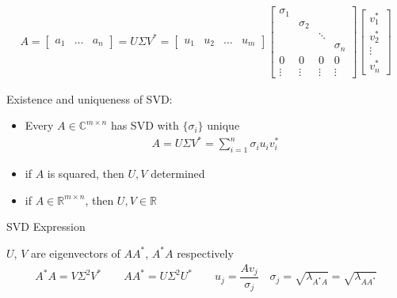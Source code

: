 \begin{itemize}[topsep=2pt,itemsep=0pt]
    \begin{align}
        A=\begin{bmatrix}
            a_1&\ldots &a_n
        \end{bmatrix} 
        =U\Sigma V^*=
        \begin{bmatrix}
            u_1&u_2&\ldots&u_m
        \end{bmatrix}
        \begin{bmatrix}
            \sigma_1&&&\\
            &\sigma_2&&\\
            &&\ddots&\\
            &&&\sigma_n\\
            0&0&0&0\\
            \vdots&\vdots&\vdots&\vdots
        \end{bmatrix}
        \begin{bmatrix}
            v_1^*\\
            v_2^*\\
            \vdots\\
            v_n^*
        \end{bmatrix}
    \end{align}
\end{itemize}


    Existence and uniqueness of SVD:
\begin{itemize}[topsep=2pt,itemsep=0pt]
    \item Every $ A\in\mathbb{C}^{m\times n} $ has SVD with $ \{\sigma_i\} $ unique
    \begin{align}
        A=U\Sigma V^* =\sum_{i=1}^n\sigma _iu_iv_i^*
    \end{align}
    
    \item if $ A $ is squared, then $ U,V $ determined
    \item if $ A\in\mathbb{R}^{m\times n} $, then $ U,V \in \mathbb{R}$ 
\end{itemize}

\begin{point}
    SVD Expression
\end{point}

    $ U $, $ V $ are eigenvectors of $ AA^* $, $ A^*A $ respectively
\begin{align}
    A^*A=V\Sigma ^2V^*\qquad AA^*=U\Sigma ^2U^*\qquad u_j=\dfrac{Av_j}{\sigma _j}\quad \sigma _j=\sqrt{\lambda _{A^*A}}=\sqrt{\lambda _{AA^*}}
\end{align}

